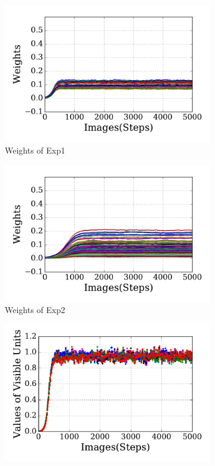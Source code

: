 \begin{figure}
	\centering
	\begin{subfigure}[t]{0.45\textwidth}
		\includegraphics[width=\textwidth]{pics_sdlm/21_exp_AE_noise/exp1_weights_s.pdf}
		\caption{Weights of Exp1}
	\end{subfigure}
	\begin{subfigure}[t]{0.45\textwidth}
		\includegraphics[width=\textwidth]{pics_sdlm/21_exp_AE_noise/exp2_weights_s.pdf}
		\caption{Weights of Exp2}
	\end{subfigure}
	\begin{subfigure}[t]{0.45\textwidth}
		\includegraphics[width=\textwidth]{pics_sdlm/21_exp_AE_noise/exp1_recon_s.pdf}

\end{subfigure}
\end{figure}
